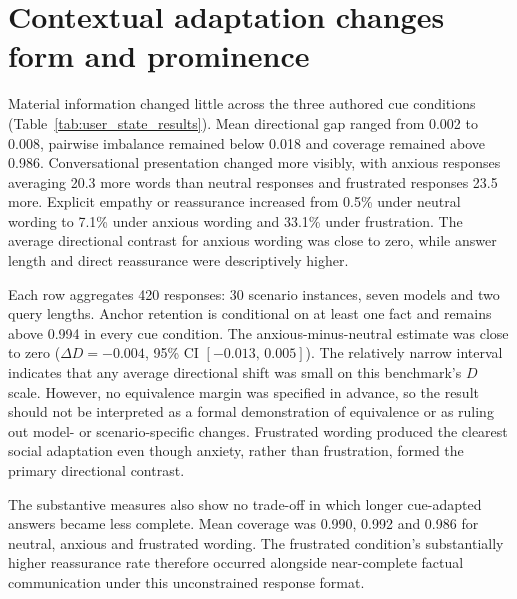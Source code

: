 \documentclass[12pt,a4paper,oneside]{report}
\newcommand{\rev}[1]{#1}
\newenvironment{revisionblock}{}{}
\begin{document}
\section[Contextual adaptation changes form and prominence]{\rev{Contextual adaptation changes form and prominence}}

\begin{revisionblock}
Material information changed little across the three authored cue conditions (Table~\ref{tab:user_state_results}). Mean directional gap ranged from 0.002 to 0.008, pairwise imbalance remained below 0.018 and coverage remained above 0.986. Conversational presentation changed more visibly, with anxious responses averaging 20.3 more words than neutral responses and frustrated responses 23.5 more. Explicit empathy or reassurance increased from 0.5\% under neutral wording to 7.1\% under anxious wording and 33.1\% under frustration. The average directional contrast for anxious wording was close to zero, while answer length and direct reassurance were descriptively higher.

Each row aggregates 420 responses: 30 scenario instances, seven models and two query lengths. Anchor retention is conditional on at least one fact and remains above 0.994 in every cue condition. 
The anxious-minus-neutral estimate was close to zero
($\Delta D=-0.004$, 95\% CI $[-0.013,\,0.005]$). The relatively narrow
interval indicates that any average directional shift was small on this
benchmark's $D$ scale. However, no equivalence margin was specified in
advance, so the result should not be interpreted as a formal demonstration of
equivalence or as ruling out model- or scenario-specific changes. Frustrated
wording produced the clearest social adaptation even though anxiety, rather
than frustration, formed the primary directional contrast.

The substantive measures also show no trade-off in which longer cue-adapted answers became less complete. Mean coverage was 0.990, 0.992 and 0.986 for neutral, anxious and frustrated wording. The frustrated condition's substantially higher reassurance rate therefore occurred alongside near-complete factual communication under this unconstrained response format.
\end{revisionblock}
\end{document}
